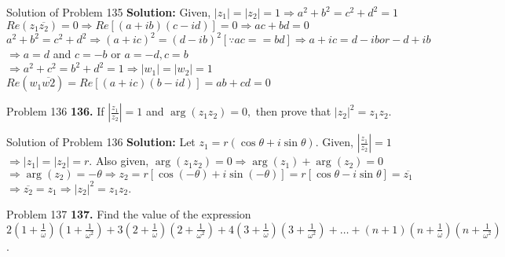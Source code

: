 \documentclass[aspectratio=169,8pt]{beamer}
\begin{document}
\begin{frame}{Solution of Problem 135}
  \textbf{Solution:} Given, $|z_1| = |z_2| = 1\Rightarrow a^2 + b^2 = c^2 + d^2 = 1$\\
  \vspace*{0.2cm}
  $Re(z_1\overline{z_2}) = 0 \Rightarrow Re[(a + ib)(c - id)] = 0 \Rightarrow ac + bd = 0$\\
  \vspace*{0.2cm}
  $a^2 + b^2 = c^2 + d^2 \Rightarrow (a + ic)^2 = (d - ib)^2[\because ac = =bd] \Rightarrow a + ic = d - ib or -d + ib$\\
  \vspace*{0.2cm}
  $\Rightarrow a = d$ and $c = -b$ or $a = -d, c = b$\\
  \vspace*{0.2cm}
  $\Rightarrow a^2 + c^2 = b^2 + d^2 = 1 \Rightarrow |w_1| = |w_2| = 1$\\
  \vspace*{0.2cm}
  $Re(w_1\overline{w2}) = Re[(a + ic)(b - id)] = ab + cd = 0$
\end{frame}
\begin{frame}{Problem 136}
  \textbf{136.} If $\left|\frac{z_1}{z_2}\right| = 1$ and $\arg(z_1z_2) = 0,$ then prove that $|z_2|^2 = z_1z_2$.
\end{frame}
\begin{frame}{Solution of Problem 136}
  \textbf{Solution:} Let $z_1 = r(\cos\theta + i\sin\theta)$. Given, $\left|\frac{z_1}{z_2}\right| = 1$\\
  \vspace*{0.2cm}
  $\Rightarrow |z_1| = |z_2| = r$. Also given, $\arg(z_1z_2) = 0 \Rightarrow \arg(z_1) + \arg(z_2) = 0$\\
  \vspace*{0.2cm}
  $\Rightarrow \arg(z_2) = -\theta \Rightarrow z_2 = r[\cos(-\theta) + i\sin(-\theta)] = r[\cos\theta - i\sin\theta] = \overline{z_1}$\\
  \vspace*{0.2cm}
  $\Rightarrow \overline{z_2} = z_1 \Rightarrow |z_2|^2 = z_1z_2$.
\end{frame}
\begin{frame}{Problem 137}
  \textbf{137.} Find the value of the expression $2\left(1 + \frac{1}{\omega}\right)\left(1 + \frac{1}{\omega^2}\right) + 3\left(2
  + \frac{1}{\omega}\right)\left(2 + \frac{1}{\omega^2}\right) + 4\left(3 + \frac{1}{\omega}\right)\left(3 +
  \frac{1}{\omega^2}\right) + \ldots + (n + 1)\left(n + \frac{1}{\omega}\right)\left(n + \frac{1}{\omega^2}\right)$.
\end{frame}
\end{document}
